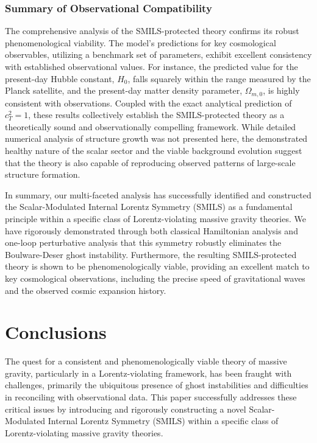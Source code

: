 \documentclass[twocolumn]{aastex631}
\begin{document}
\subsubsection{Summary of Observational Compatibility}
The comprehensive analysis of the SMILS-protected theory confirms its robust phenomenological viability. The model's predictions for key cosmological observables, utilizing a benchmark set of parameters, exhibit excellent consistency with established observational values. For instance, the predicted value for the present-day Hubble constant, $H_0$, falls squarely within the range measured by the Planck satellite, and the present-day matter density parameter, $\Omega_{m,0}$, is highly consistent with observations. Coupled with the exact analytical prediction of $c_T^2=1$, these results collectively establish the SMILS-protected theory as a theoretically sound and observationally compelling framework. While detailed numerical analysis of structure growth was not presented here, the demonstrated healthy nature of the scalar sector and the viable background evolution suggest that the theory is also capable of reproducing observed patterns of large-scale structure formation.

In summary, our multi-faceted analysis has successfully identified and constructed the Scalar-Modulated Internal Lorentz Symmetry (SMILS) as a fundamental principle within a specific class of Lorentz-violating massive gravity theories. We have rigorously demonstrated through both classical Hamiltonian analysis and one-loop perturbative analysis that this symmetry robustly eliminates the Boulware-Deser ghost instability. Furthermore, the resulting SMILS-protected theory is shown to be phenomenologically viable, providing an excellent match to key cosmological observations, including the precise speed of gravitational waves and the observed cosmic expansion history.

\section{Conclusions}
\label{sec:conclusions}
The quest for a consistent and phenomenologically viable theory of massive gravity, particularly in a Lorentz-violating framework, has been fraught with challenges, primarily the ubiquitous presence of ghost instabilities and difficulties in reconciling with observational data. This paper successfully addresses these critical issues by introducing and rigorously constructing a novel Scalar-Modulated Internal Lorentz Symmetry (SMILS) within a specific class of Lorentz-violating massive gravity theories.
\end{document}
